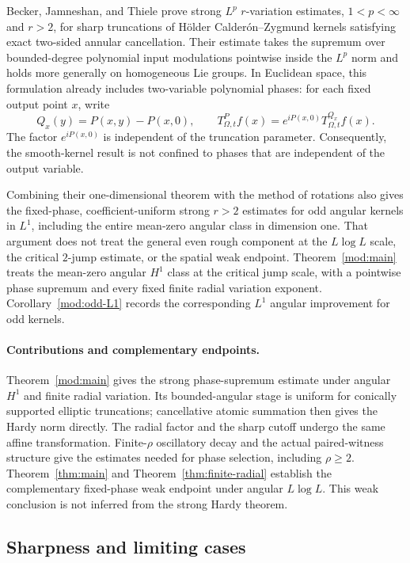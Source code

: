 \documentclass[11pt]{article}
\numberwithin{equation}{section}
\theoremstyle{remark}
\theoremstyle{definition}
\begin{document}
Becker, Jamneshan, and Thiele
\cite[Theorem~1.3 and Corollary~1.4]{BJT} prove strong $L^p$
$r$-variation estimates, $1<p<\infty$ and $r>2$, for sharp truncations of
H\"older Calder\'on--Zygmund kernels satisfying exact two-sided annular
cancellation. Their estimate takes the supremum over bounded-degree
polynomial input modulations pointwise inside the $L^p$ norm and holds
more generally on homogeneous Lie groups. In Euclidean space, this
formulation already includes two-variable polynomial phases: for each
fixed output point $x$, write
\[
 Q_x(y)=P(x,y)-P(x,0),\qquad
 T^P_{\Omega,t}f(x)=e^{iP(x,0)}T^{Q_x}_{\Omega,t}f(x).
\]
The factor $e^{iP(x,0)}$ is independent of the truncation parameter.
Consequently, the smooth-kernel result is not confined to phases that
are independent of the output variable.

Combining their one-dimensional theorem with the method of rotations
also gives the fixed-phase, coefficient-uniform strong $r>2$ estimates
for odd angular kernels in $L^1$, including the entire mean-zero angular
class in dimension one. That argument does not treat the general even
rough component at the $L\log L$ scale, the critical $2$-jump estimate,
or the spatial weak endpoint. Theorem~\ref{mod:main} treats the
mean-zero angular $H^1$ class at the critical jump scale, with a
pointwise phase supremum and every fixed finite radial variation exponent. Corollary~\ref{mod:odd-L1} records the corresponding
$L^1$ angular improvement for odd kernels.

\paragraph{Contributions and complementary endpoints.}
Theorem~\ref{mod:main} gives the strong phase-supremum estimate under
angular $H^1$ and finite radial variation. Its bounded-angular stage is
uniform for conically supported elliptic truncations; cancellative
atomic summation then gives the Hardy norm directly. The radial factor
and the sharp cutoff undergo the same affine transformation.
Finite-$\rho$ oscillatory decay and the actual paired-witness structure
give the estimates needed for phase selection, including $\rho\ge2$.
Theorem~\ref{thm:main} and Theorem~\ref{thm:finite-radial} establish the
complementary fixed-phase weak endpoint under angular $L\log L$.
This weak conclusion is not inferred from the strong Hardy theorem.

\subsection{Sharpness and limiting cases}\label{intro:sharpness}
\end{document}
